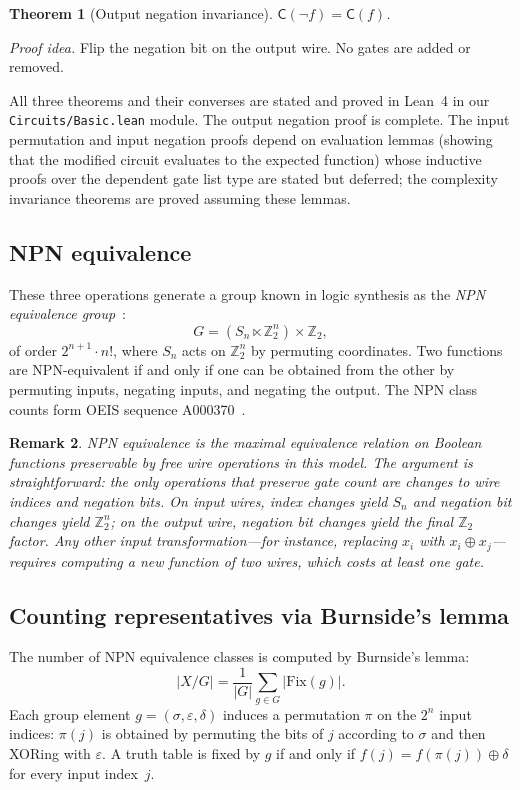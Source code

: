 \documentclass[11pt]{article}
\newtheorem{theorem}{Theorem}
\newtheorem{remark}[theorem]{Remark}
\newcommand{\Sn}{S_n}
\newcommand{\Ztwo}{\mathbb{Z}_2}
\newcommand{\CC}{\mathsf{C}}
\begin{document}
\begin{theorem}[Output negation invariance]
$\CC(\lnot f) = \CC(f)$.
\end{theorem}
\noindent\textit{Proof idea.} Flip the negation bit on the output wire. No
gates are added or removed.

\medskip
All three theorems and their converses are stated and proved in Lean~4 in our
\texttt{Circuits/Basic.lean} module. The output negation proof is complete. The
input permutation and input negation proofs depend on evaluation lemmas
(showing that the modified circuit evaluates to the expected function) whose
inductive proofs over the dependent gate list type are stated but deferred; the
complexity invariance theorems are proved assuming these lemmas.

\subsection{NPN equivalence}

These three operations generate a group known in logic synthesis as the
\emph{NPN equivalence group}~\cite{npn-corrected}:
\[
  G = (\Sn \ltimes \Ztwo^n) \times \Ztwo,
\]
of order $2^{n+1} \cdot n!$, where $\Sn$ acts on $\Ztwo^n$ by permuting
coordinates. Two functions are NPN-equivalent if and only if one can be obtained
from the other by permuting inputs, negating inputs, and negating the output.
The NPN class counts form OEIS sequence A000370~\cite{oeis-a000370}.

\begin{remark}
NPN equivalence is the maximal equivalence relation on Boolean functions
preservable by free wire operations in this model. The argument is
straightforward: the only operations that preserve gate count are changes to
wire indices and negation bits. On input wires, index changes yield $\Sn$ and
negation bit changes yield $\Ztwo^n$; on the output wire, negation bit changes
yield the final $\Ztwo$ factor. Any other input transformation---for instance,
replacing $x_i$ with $x_i \oplus x_j$---requires computing a new function of
two wires, which costs at least one gate.
\end{remark}

\subsection{Counting representatives via Burnside's lemma}

The number of NPN equivalence classes is computed by Burnside's lemma:
\[
  |X / G| = \frac{1}{|G|} \sum_{g \in G} |\mathrm{Fix}(g)|.
\]
Each group element $g = (\sigma, \varepsilon, \delta)$ induces a permutation
$\pi$ on the $2^n$ input indices: $\pi(j)$ is obtained by permuting the bits of
$j$ according to $\sigma$ and then XORing with $\varepsilon$. A truth table is
fixed by $g$ if and only if $f(j) = f(\pi(j)) \oplus \delta$ for every input
index~$j$.
\end{document}
